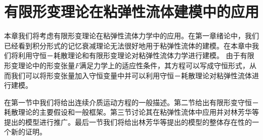\chapter{有限形变理论在粘弹性流体建模中的应用}


% 
本章我们将考虑有限形变理论在粘弹性流体力学中的应用。在第一章绪论中，我们已经看到积分形式的记忆衰减理论无法很好地用于粘弹性流体的建模。在本章中我们将利用守恒－耗散理论和有限形变理论对粘弹性流体力学进行建模。
由于有限形变理论中的形变张量$F$满足力学上的适应性条件，其方程可以写成守恒形式，从而我们可以将形变张量加入守恒变量中并可以利用守恒－耗散理论对粘弹性流体进行建模。

在第一节中我们将给出连续介质运动方程的一般描述。第二节给出有限形变守恒－耗散理论的主要假设和一般框架。第三节讨论其在粘弹性流体中应用并对林芳华等提出的模型进行推广。最后一节我们将给出林芳华等提出的模型的整体存在性的一个新的证明。

